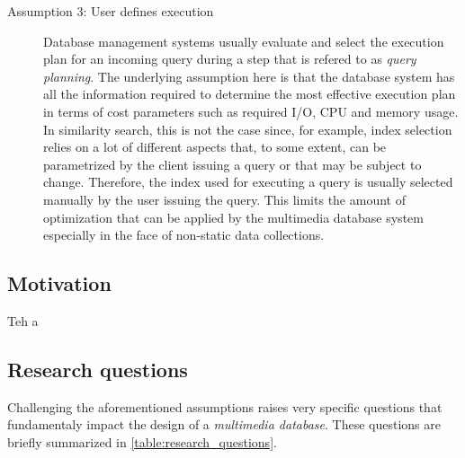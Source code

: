 \begin{description}
    \item[Assumption 3: User defines execution] Database management systems usually evaluate and select the execution plan for an incoming query during a step that is refered to as \emph{query planning}. The underlying assumption here is that the database system has all the information required to determine the most effective execution plan in terms of cost parameters such as required I/O, CPU and memory usage. In similarity search, this is not the case since, for example, index selection relies on a lot of different aspects that, to some extent, can be parametrized by the client issuing a query or that may be subject to change. Therefore, the index used for executing a query is usually selected manually by the user issuing the query. This limits the amount of optimization that can be applied by the multimedia database system especially in the face of non-static data collections.
\end{description}



\subsection{Motivation}

Teh a


\subsection{Research questions}

Challenging the aforementioned assumptions raises very specific questions that fundamentaly impact the design of a \emph{multimedia database}. These questions are briefly summarized in \cref{table:research_questions}.

